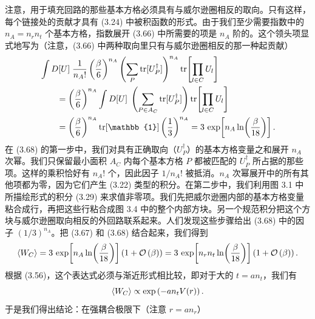 注意，用于填充回路的那些基本方格必须具有与威尔逊圈相反的取向。只有这样，每个链接处的贡献才具有 (3.24) 中被积函数的形式。由于我们至少需要指数中的 $n_A = n_r n_t$ 个基本方格，指数展开 (3.66) 中所需要的项是 $n_A$ 阶的。这个领头项显式地写为（注意，(3.66) 中两种取向里只有与威尔逊圈相反的那一种起贡献）
\begin{equation}
\begin{split}
  &\int D[U]\;\frac{1}{n_A!}\left(\frac{\beta}{6}\right)^{n_A}
    \left(\sum_P \tr[U_P^\dagger]\right)^{n_A}
    \tr\!\left[\prod_{l\in C} U_l\right] \\
  &\qquad = \left(\frac{\beta}{6}\right)^{n_A}\int D[U]\;
    \left(\sum_{P\in A_C} \tr[U_P^\dagger]\right)
    \tr\!\left[\prod_{l\in C} U_l\right] \\
  &\qquad = \left(\frac{\beta}{6}\right)^{n_A}\tr[\mathbb{1}]
    \left(\frac{1}{3}\right)^{n_A}
  = 3\,\exp\!\left[n_A \ln\!\left(\frac{\beta}{18}\right)\right] .
\end{split}
\end{equation}
在 (3.68) 的第一步中，我们对具有正确取向（$U_P^\dagger$）的基本方格变量之和展开 $n_A$ 次幂。我们只保留最小面积 $A_C$ 内每个基本方格 $P$ 都被匹配的 $U_P^\dagger$ 所占据的那些项。这样的乘积恰好有 $n_A!$ 个，因此因子 $1/n_A!$ 被抵消。$n_A$ 次幂展开中的所有其他项都为零，因为它们产生 (3.22) 类型的积分。在第二步中，我们利用图 3.1 中所描绘形式的积分 (3.29) 来求值非零项。我们先把威尔逊圈内部的基本方格变量粘合成行，再把这些行粘合成图 3.4 中的整个内部方块。另一个规范积分把这个方块与威尔逊圈取向相反的外回路联系起来。人们发现这些步骤给出 (3.68) 中的因子 $(1/3)^{n_A}$。把 (3.67) 和 (3.68) 结合起来，我们得到
\begin{equation}
  \left\langle W_C \right\rangle = 3\,\exp\!\left[n_A \ln\!\left(\frac{\beta}{18}\right)\right]
    \left(1 + \mathcal{O}\left(\beta\right)\right)
  = 3\,\exp\!\left[n_r n_t \ln\!\left(\frac{\beta}{18}\right)\right]
    \left(1 + \mathcal{O}\left(\beta\right)\right) .
\end{equation}
根据 (3.56)，这个表达式必须与渐近形式相比较，即对于大的 $t = a n_t$，我们有
\begin{equation}
  \left\langle W_C \right\rangle \propto \exp\left(-a n_t V(r)\right) .
\end{equation}
于是我们得出结论：在强耦合极限下（注意 $r = a n_r$）

